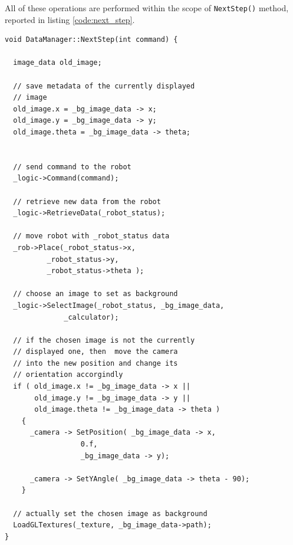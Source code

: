 All of these operations are performed within the 
scope of \texttt{NextStep()} method, reported in 
listing \ref{code:next_step}.
\\
\begin{lstlisting}[caption={The \texttt{DataManager::NextStep()} method}, label={code:next_step}]
void DataManager::NextStep(int command) {

  image_data old_image;

  // save metadata of the currently displayed 
  // image
  old_image.x = _bg_image_data -> x;
  old_image.y = _bg_image_data -> y;
  old_image.theta = _bg_image_data -> theta;


  // send command to the robot
  _logic->Command(command);

  // retrieve new data from the robot
  _logic->RetrieveData(_robot_status);

  // move robot with _robot_status data
  _rob->Place(_robot_status->x,
	      _robot_status->y,
	      _robot_status->theta ); 

  // choose an image to set as background
  _logic->SelectImage(_robot_status, _bg_image_data,
		      _calculator);

  // if the chosen image is not the currently
  // displayed one, then  move the camera
  // into the new position and change its 
  // orientation accorgindly
  if ( old_image.x != _bg_image_data -> x ||
       old_image.y != _bg_image_data -> y ||
       old_image.theta != _bg_image_data -> theta )
    {
      _camera -> SetPosition( _bg_image_data -> x,
			      0.f,
			      _bg_image_data -> y);
      
      _camera -> SetYAngle( _bg_image_data -> theta - 90);
    }

  // actually set the chosen image as background
  LoadGLTextures(_texture, _bg_image_data->path);
}
\end{lstlisting}

